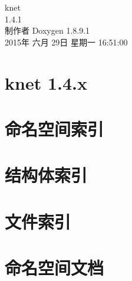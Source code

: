 \documentclass[twoside]{book}
\newcommand{\+}{\discretionary{\mbox{\scriptsize$\hookleftarrow$}}{}{}}
\newcommand{\clearemptydoublepage}{%
  \newpage{\pagestyle{empty}\cleardoublepage}%
}
\begin{document}
\hypersetup{pageanchor=false,
             bookmarks=true,
             bookmarksnumbered=true,
             pdfencoding=unicode
            }
\begin{titlepage}
\vspace*{7cm}
\begin{center}%
{\Large knet \\[1ex]\large 1.\+4.\+1 }\\
\vspace*{1cm}
{\large 制作者 Doxygen 1.8.9.1}\\
\vspace*{0.5cm}
{\small 2015年 六月 29日 星期一 16:51:00}\\
\end{center}
\end{titlepage}
\clearemptydoublepage
\tableofcontents
\clearemptydoublepage
{}
\hypersetup{pageanchor=true}

\chapter{knet 1.4.x}
\label{md_E_1_knet-git_knet_README}
\hypertarget{md_E_1_knet-git_knet_README}{}

\chapter{命名空间索引}

\chapter{结构体索引}

\chapter{文件索引}

\chapter{命名空间文档}

\end{document}
